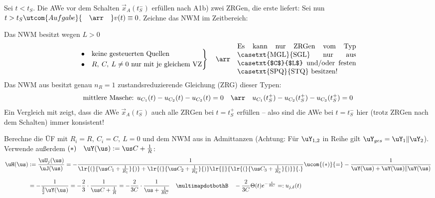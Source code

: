 \clearpage{}
Sei $t<t_S$. Die AWe vor dem Schalten $\vec{x}_A(t_S^-)$ erfüllen nach A1b) zwei ZRGen, die erste liefert:
%
%
Sei nun $t>t_S\utcom{Aufgabe}{\quad\arr\quad} v(t)\equiv0$. Zeichne das NWM im Zeitbereich:

\noindent Das NWM besitzt wegen $L>0$
\[%
	\left.\begin{aligned}%
		\bullet\quad&\text{keine gesteuerten Quellen}\\%
		\bullet\quad&R,\:C,\:L\neq 0\text{ nur mit je gleichem VZ}%
	\end{aligned}\right\}\quad\arr\quad\begin{minipage}[c]{6cm}%
		Es kann nur ZRGen vom Typ \casetxt{MGL}{SGL} nur aus \casetxt{$C$}{$L$} und/oder festen \casetxt{SPQ}{STQ} besitzen!
	\end{minipage}%
\]%
%
Das NWM aus  besitzt genau $n_R=1$ zustandsreduzierende Gleichung (ZRG) dieser Typen:
\[%
	\text{mittlere Masche: }u_{C_1}(t)-u_{C_2}(t)-u_{C_3}(t)=0\quad\arr\quad u_{C_1}(t_S^+)-u_{C_2}(t_S^+)-u_{C_3}(t_S^+)=0%
\]%
%
Ein Vergleich mit  zeigt, dass die AWe $\vec{x}_A(t_S^-)$ auch alle ZRGen bei $t=t_S^+$ erfüllen -- also sind die AWe bei $t=t_S^-$ hier (trotz ZRGen nach dem Schalten) immer konsistent!


Berechne die ÜF mit $R_i=R,\:C_i=C,\:L=0$ und dem NWM aus  in Admittanzen (Achtung: Für $\uY_{1,2}$ in Reihe gilt $\uY_{ges}=\uY_1\|\uY_2$). Verwende außerdem $(*)\quad\uY(\us):=\us C+\frac{1}{R}$:
\begin{align*}%
	\uH(\us)&:=\frac{\uU_j(\us)}{\uJ(\us)}=-\frac{1}{
		\lr{(}{\us C_1+\frac{1}{R_1}}{)}+\lr{(}{\us C_2+\frac{1}{R_2}}{)}\lr{\|}{%
			\lr{(}{\us C_3+\frac{1}{R_3}}{)}
		}{.}%
	}\ucom{(*)}{=}-\frac{1}{%
		\uY(\us)+\uY(\us)\|\uY(\us)%
	}\\[2.5mm]%
%
	&=-\frac{1}{\frac{3}{2}\uY(\us)}=-\frac{2}{3}\cdot\frac{1}{\us C+\frac{1}{R}}=-\frac{2}{3C}\cdot\frac{1}{\us+\frac{1}{RC}}\quad\multimapdotbothB\quad-\frac{2}{3C}\Theta(t)e^{-\frac{t}{RC}}=:u_{j,\delta}(t)%
\end{align*}%


